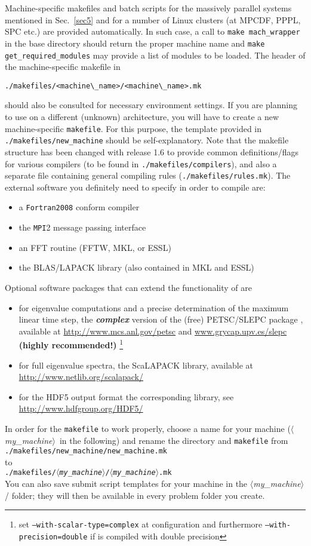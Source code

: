 \documentclass[12pt]{article}
\newcommand{\mach}{$\langle$\textsl{my\_machine}$\rangle$}
\begin{document}
Machine-specific makefiles and batch scripts for the massively parallel systems mentioned in Sec.~\ref{sec5} and for a
number of Linux clusters (at MPCDF, PPPL, SPC etc.) are provided automatically. In such case, a call to \texttt{make mach\_wrapper} in the \gene base directory should return the proper machine name and \texttt{make get\_required\_modules} may provide a list of modules to be loaded. The header of the machine-specific makefile in
\begin{verbatim}
./makefiles/<machine\_name>/<machine\_name>.mk
\end{verbatim}
should also be consulted for necessary environment settings.
If you are planning to use \gene on a different (unknown) architecture, you will have to create a new machine-specific
{\tt makefile}. For this purpose, the template provided in \texttt{./makefiles/new\_machine} should
be self-explanatory. Note that the makefile structure has been changed with release 1.6 to provide common
definitions/flags for various compilers (to be found in \texttt{./makefiles/compilers}), and also a separate
file containing general compiling rules (\texttt{./makefiles/rules.mk}).
The external software you definitely need to specify in order to compile \gene are:
\begin{itemize}
\item a {\tt Fortran2008} conform compiler
\item the {\tt MPI}2 message passing interface
\item an FFT routine (FFTW, MKL, or ESSL)
\item the BLAS/LAPACK library (also contained in MKL and ESSL)
\end{itemize}
Optional software packages that can extend the functionality of \gene are
\begin{itemize}
\item for eigenvalue computations and a precise determination of the maximum linear time step,
the {\bf \emph{complex}} version of the (free) PETSC/SLEPC package
\cite{petsc1,petsc2,slepc}, available at \url{http://www.mcs.anl.gov/petsc}
and \url{www.grycap.upv.es/slepc} {\bf (highly recommended!)}
\footnote{set {\tt --with-scalar-type=complex} at configuration and furthermore {\tt --with-precision=double} if \gene is compiled with double precision}
\item for full eigenvalue spectra, the ScaLAPACK library, available at \url{http://www.netlib.org/scalapack/}
\item for the HDF5 output format the corresponding library, see \url{http://www.hdfgroup.org/HDF5/}
\end{itemize}
In order for the {\tt makefile} to work properly, choose a name for
your machine (\mach\ in the following) and rename the directory and {\tt makefile} from\\
\texttt{./makefiles/new\_machine/new\_machine.mk}\\ to\\ \texttt{./makefiles/\mach/\mach.mk}\\
You can also save submit script templates for your machine in the \mach/ folder; they will then be
available in every problem folder you create.
\end{document}

